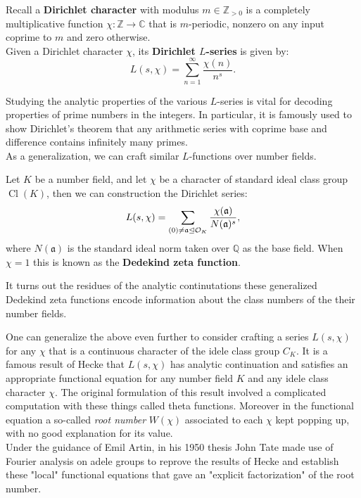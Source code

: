 \documentclass[11pt, x11names, openany]{book}
\newcommand{\zz}{\mathbb{Z}}
\newcommand{\qq}{\mathbb{Q}}
\newcommand{\cc}{\mathbb{C}}
\newcommand{\fraka}{\mathfrak{a}}
\newcommand{\ideal}{\trianglelefteq}
\DeclareMathOperator{\cl}{Cl}
\begin{document}
\begin{example}
\label{example: Dirichlet L-func}
    Recall a \textbf{Dirichlet character} with modulus $m \in \zz_{> 0}$ is a completely multiplicative function $\chi: \zz \to \cc$ that is $m$-periodic, nonzero on any input coprime to $m$ and zero otherwise.\\
    Given a Dirichlet character $\chi$, its \textbf{Dirichlet $L$-series} is given by:
    \begin{equation*}
        L(s, \chi) = \sum^\infty_{n=1} \frac{\chi(n)}{n^s}.
    \end{equation*}
\end{example}

Studying the analytic properties of the various $L$-series is vital for decoding properties of prime numbers in the integers. In particular, it is famously used to show Dirichlet's theorem that any arithmetic series with coprime base and difference contains infinitely many primes.\\

As a generalization, we can craft similar $L$-functions over number fields.

\begin{example}
\label{example: Generalized Dedekind Zeta}
Let $K$ be a number field, and let $\chi$ be a character of standard ideal class group $\cl(K)$, then we can construction the Dirichlet series:
\begin{equation*}
    L(s, \chi) = \sum_{(0) \neq \fraka \ideal \calo_K} \frac{\chi(\fraka)}{N(\fraka)^s},
\end{equation*}
where $N(\fraka)$ is the standard ideal norm taken over $\qq$ as the base field. When $\chi = 1$ this is known as the \textbf{Dedekind zeta function}.
\end{example}

It turns out the residues of the analytic continutations these generalized Dedekind zeta functions encode information about the class numbers of the their number fields. 

One can generalize the above even further to consider crafting a series $L(s, \chi)$ for any $\chi$ that is a continuous character of the idele class group $C_K$. It is a famous result of Hecke that $L(s, \chi)$ has analytic continuation and satisfies an appropriate functional equation for any number field $K$ and any idele class character $\chi$. The original formulation of this result involved a complicated computation with these things called theta functions. Moreover in the functional equation a so-called \textit{root number} $W(\chi)$ associated to each $\chi$ kept popping up, with no good explanation for its value.\\
Under the guidance of Emil Artin, in his 1950 thesis John Tate made use of Fourier analysis on adele groups to reprove the results of Hecke and establish these "local" functional equations that gave an "explicit factorization" of the root number.
\end{document}
